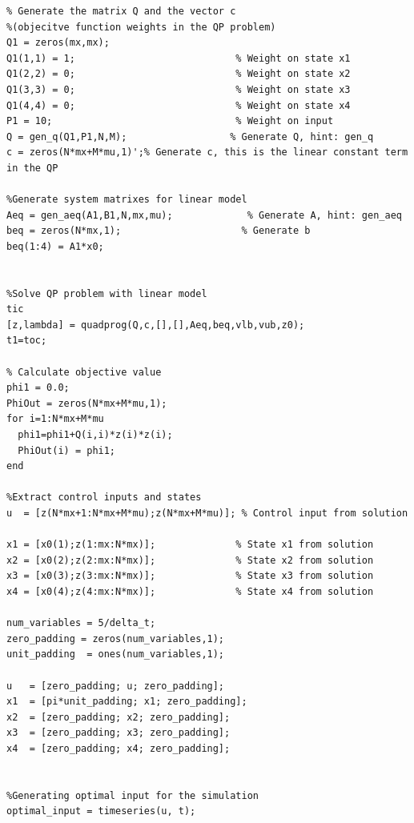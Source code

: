 \begin{verbatim}
% Generate the matrix Q and the vector c 
%(objecitve function weights in the QP problem)
Q1 = zeros(mx,mx);
Q1(1,1) = 1;                            % Weight on state x1
Q1(2,2) = 0;                            % Weight on state x2
Q1(3,3) = 0;                            % Weight on state x3
Q1(4,4) = 0;                            % Weight on state x4
P1 = 10;                                % Weight on input
Q = gen_q(Q1,P1,N,M);                  % Generate Q, hint: gen_q
c = zeros(N*mx+M*mu,1)';% Generate c, this is the linear constant term in the QP

%Generate system matrixes for linear model
Aeq = gen_aeq(A1,B1,N,mx,mu);             % Generate A, hint: gen_aeq
beq = zeros(N*mx,1);                     % Generate b
beq(1:4) = A1*x0;


%Solve QP problem with linear model
tic
[z,lambda] = quadprog(Q,c,[],[],Aeq,beq,vlb,vub,z0); 
t1=toc;

% Calculate objective value
phi1 = 0.0;
PhiOut = zeros(N*mx+M*mu,1);
for i=1:N*mx+M*mu
  phi1=phi1+Q(i,i)*z(i)*z(i);
  PhiOut(i) = phi1;
end

%Extract control inputs and states
u  = [z(N*mx+1:N*mx+M*mu);z(N*mx+M*mu)]; % Control input from solution

x1 = [x0(1);z(1:mx:N*mx)];              % State x1 from solution
x2 = [x0(2);z(2:mx:N*mx)];              % State x2 from solution
x3 = [x0(3);z(3:mx:N*mx)];              % State x3 from solution
x4 = [x0(4);z(4:mx:N*mx)];              % State x4 from solution

num_variables = 5/delta_t;
zero_padding = zeros(num_variables,1);
unit_padding  = ones(num_variables,1);

u   = [zero_padding; u; zero_padding];
x1  = [pi*unit_padding; x1; zero_padding];
x2  = [zero_padding; x2; zero_padding];
x3  = [zero_padding; x3; zero_padding];
x4  = [zero_padding; x4; zero_padding];


%Generating optimal input for the simulation
optimal_input = timeseries(u, t);

\end{verbatim}

